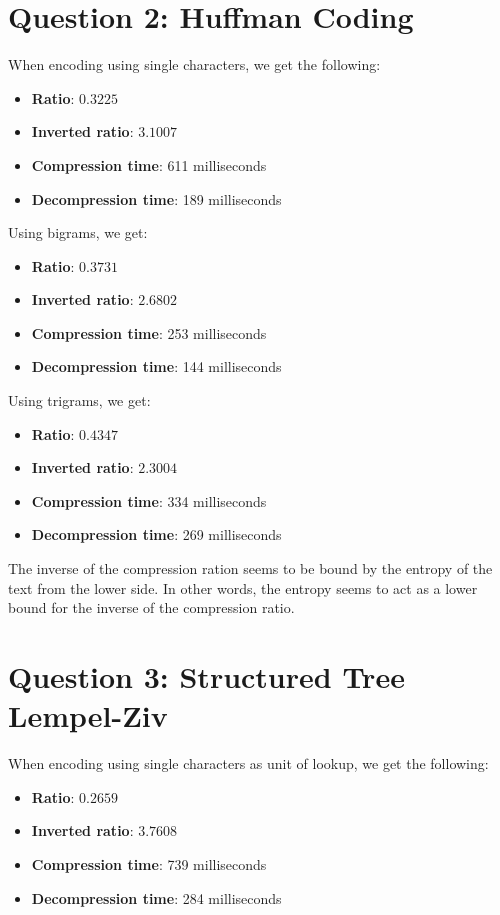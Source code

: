 \documentclass{article}
\begin{document}
\clearpage

\section{Question 2: Huffman Coding}

When encoding using single characters, we get the following:

\begin{itemize}
  \item \textbf{Ratio}: $0.3225$
  \item \textbf{Inverted ratio}: $3.1007$
  \item \textbf{Compression time}: 611 milliseconds
  \item \textbf{Decompression time}: 189 milliseconds
\end{itemize}

Using bigrams, we get:

\begin{itemize}
  \item \textbf{Ratio}: $0.3731$
  \item \textbf{Inverted ratio}: $2.6802$
  \item \textbf{Compression time}: 253 milliseconds
  \item \textbf{Decompression time}: 144 milliseconds
\end{itemize}

Using trigrams, we get:

\begin{itemize}
  \item \textbf{Ratio}: $0.4347$
  \item \textbf{Inverted ratio}: $2.3004$
  \item \textbf{Compression time}: 334 milliseconds
  \item \textbf{Decompression time}: 269 milliseconds
\end{itemize}

The inverse of the compression ration seems to be bound by the entropy of the
text from the lower side. In other words, the entropy seems to act as a lower
bound for the inverse of the compression ratio.

\section{Question 3: Structured Tree Lempel-Ziv}

When encoding using single characters as unit of lookup, we get the following:

\begin{itemize}
  \item \textbf{Ratio}: $0.2659$
  \item \textbf{Inverted ratio}: $3.7608$
  \item \textbf{Compression time}: 739 milliseconds
  \item \textbf{Decompression time}: 284 milliseconds
\end{itemize}
\end{document}
